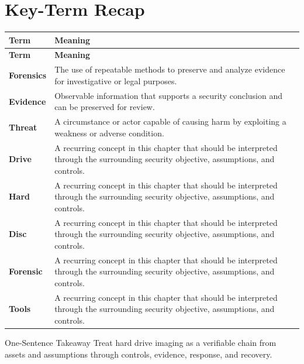 \documentclass[11pt,letterpaper]{article}
\begin{document}
\section*{Key-Term Recap}
\begin{longtable}{>{\raggedright\arraybackslash}p{}>{\raggedright\arraybackslash}p{}}
\toprule\rowcolor{Navy}\color{white}\textbf{Term} & \color{white}\textbf{Meaning}\\\midrule
\endfirsthead
\toprule\rowcolor{Navy}\color{white}\textbf{Term} & \color{white}\textbf{Meaning}\\\midrule
\endhead
\textbf{Forensics} & The use of repeatable methods to preserve and analyze evidence for investigative or legal purposes. \\\midrule
\textbf{Evidence} & Observable information that supports a security conclusion and can be preserved for review. \\\midrule
\textbf{Threat} & A circumstance or actor capable of causing harm by exploiting a weakness or adverse condition. \\\midrule
\textbf{Drive} & A recurring concept in this chapter that should be interpreted through the surrounding security objective, assumptions, and controls. \\\midrule
\textbf{Hard} & A recurring concept in this chapter that should be interpreted through the surrounding security objective, assumptions, and controls. \\\midrule
\textbf{Disc} & A recurring concept in this chapter that should be interpreted through the surrounding security objective, assumptions, and controls. \\\midrule
\textbf{Forensic} & A recurring concept in this chapter that should be interpreted through the surrounding security objective, assumptions, and controls. \\\midrule
\textbf{Tools} & A recurring concept in this chapter that should be interpreted through the surrounding security objective, assumptions, and controls. \\\midrule
\bottomrule
\end{longtable}
\begin{CornellExamBox}{One-Sentence Takeaway}
Treat hard drive imaging as a verifiable chain from assets and assumptions through controls, evidence, response, and recovery.
\end{CornellExamBox}
\end{document}
